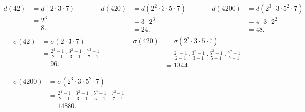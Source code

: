\documentclass[UTF8]{ctexart}
\begin{document}
\subsection{}   %
\[
    \begin{aligned}
        d(42)
        & = 
        d(2\cdot 3 \cdot 7)\\
        & =
        2^3\\
        & = 
        8.
    \end{aligned}
    \qquad\quad
    \begin{aligned}
        d(420)
        & = 
        d(2^2 \cdot 3 \cdot 5 \cdot 7)\\
        & =
        3\cdot 2^3 \\
        & = 
        24.
    \end{aligned}
    \qquad\quad
    \begin{aligned}
        d(4200)
        & = 
        d(2^3 \cdot 3 \cdot 5^2 \cdot 7)\\
        & =
        4\cdot 3\cdot 2^2 \\
        & = 
        48.
    \end{aligned}
\]
\begin{align*}
    &\begin{aligned}
        \sigma(42)
        & = 
        \sigma(2\cdot 3 \cdot 7)\\
        & =
        \displaystyle{
            \frac{2^2 -1 }{2-1}\cdot 
            \frac{3^2 -1 }{3-1}\cdot
            \frac{7^2 -1 }{7-1}
        }\\
        & = 
        96.
    \end{aligned} 
    \qquad
    \qquad
    \begin{aligned}
        \sigma(420)
        & = 
        \sigma(2^2 \cdot 3 \cdot 5 \cdot 7)\\
        & =
        \displaystyle{
            \frac{2^3 -1}{2-1}\cdot 
            \frac{3^2 -1}{3-1}\cdot
            \frac{5^2 -1}{5-1}\cdot
            \frac{7^2 -1}{7-1}
        }\\
        & = 
        1344.
    \end{aligned} \\
    \\
    &\begin{aligned}
            \sigma(4200)
            & = 
            \sigma(2^3 \cdot 3 \cdot 5^2 \cdot 7)\\
            & =
            \displaystyle{
                \frac{2^4 - 1}{2-1}\cdot 
                \frac{3^2 - 1}{3-1}\cdot
                \frac{5^3 - 1}{5-1}\cdot
                \frac{7^2 - 1}{7-1}
            }\\
            & = 
            14880.
        \end{aligned}
\end{align*}
\end{document}
